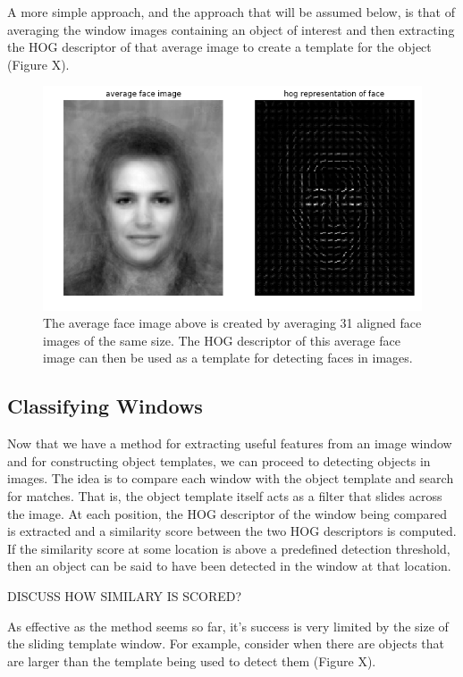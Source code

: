 \documentclass{article}
\begin{document}
A more simple approach, and the approach that will be assumed below, is that of averaging the window images containing an object of interest and then extracting the HOG descriptor of that average image to create a template for the object (Figure X).

\begin{figure}[h]
	\includegraphics[width=\linewidth]{average_face_template.png}
	\caption{The average face image above is created by averaging 31 aligned face images of the same size. The HOG descriptor of this average face image can then be used as a template for detecting faces in images.}
\end{figure}


\subsection{Classifying Windows}
Now that we have a method for extracting useful features from an image window and for constructing object templates, we can proceed to detecting objects in images. The idea is to compare each window with the object template and search for matches. That is, the object template itself acts as a filter that slides across the image. At each position, the HOG descriptor of the window being compared is extracted and a similarity score between the two HOG descriptors is computed. If the similarity score at some location is above a predefined detection threshold, then an object can be said to have been detected in the window at that location.

DISCUSS HOW SIMILARY IS SCORED?

As effective as the method seems so far, it's success is very limited by the size of the sliding template window. For example, consider when there are objects that are larger than the template being used to detect them (Figure X).
\end{document}
